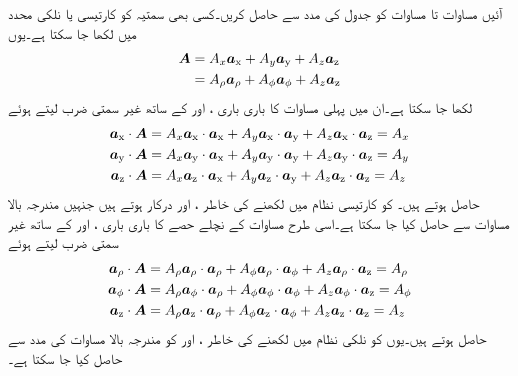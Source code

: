آئیں مساوات  تا مساوات  کو جدول  کی مدد سے حاصل کریں۔کسی بھی سمتیہ  کو کارتیسی یا نلکی محدد میں لکھا جا سکتا ہے۔یوں
\begin{gather}
\begin{aligned}\label{مساوات_سمتیہ_سمتیہ_نلکی_کارتیسی_اشکال}
\kvec{A}&=A_x \ax+A_y \ay+A_z\az\\
&=A_\rho \arho+A_\phi \aphi+A_z \az
\end{aligned}
\end{gather}
لکھا جا سکتا ہے۔ان میں پہلی مساوات کا باری باری ،  اور  کے ساتھ غیر سمتی ضرب لیتے ہوئے
\begin{gather}
\begin{aligned}\label{مساوات_سمتیہ_کارتیسی_اجزاء}
\ax \cdot \kvec{A}&=A_x \ax \cdot \ax+A_y \ax \cdot \ay+A_z \ax \cdot \az=A_x\\
\ay \cdot \kvec{A}&=A_x \ay \cdot \ax+A_y \ay \cdot \ay+A_z \ay \cdot \az=A_y\\
\az \cdot \kvec{A}&=A_x \az \cdot \ax+A_y \az \cdot \ay+A_z \az \cdot \az=A_z
\end{aligned}
\end{gather}
حاصل ہوتے ہیں۔ کو کارتیسی نظام میں لکھنے کی خاطر ،  اور  درکار ہوتے ہیں جنہیں مندرجہ بالا مساوات سے حاصل کیا جا سکتا ہے۔اسی طرح مساوات  کے نچلے حصے کا باری باری ،  اور  کے ساتھ غیر سمتی ضرب لیتے ہوئے
\begin{gather}
\begin{aligned}\label{مساوات_سمتیہ_نلکی_اجزاء}
\arho \cdot \kvec{A}&=A_\rho \arho \cdot \arho +A_\phi \arho \cdot \aphi +A_z \arho \cdot \az=A_\rho\\
\aphi \cdot \kvec{A}&=A_\rho \aphi \cdot \arho +A_\phi \aphi \cdot \aphi +A_z \aphi \cdot \az=A_\phi \\
\az \cdot \kvec{A}&=A_\rho \az \cdot \arho +A_\phi \az \cdot \aphi +A_z \az \cdot \az=A_z
\end{aligned}
\end{gather}
حاصل ہوتے ہیں۔یوں  کو نلکی نظام میں لکھنے کی خاطر ،  اور  کو مندرجہ بالا مساوات کی مدد سے حاصل کیا جا سکتا ہے۔

